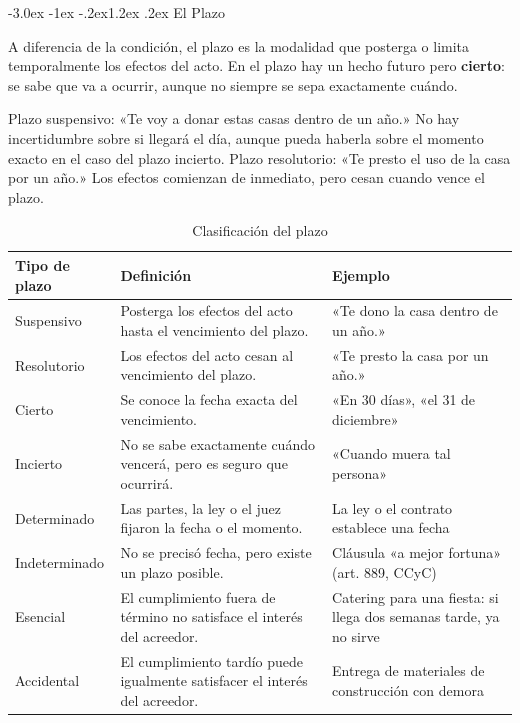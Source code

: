 \documentclass[12pt,oneside]{book}
\makeatletter
\renewcommand\section{\@startsection{section}{1}{\z@}%
  {-3.0ex \@plus -1ex \@minus -.2ex}{1.2ex \@plus .2ex}%
  {\normalfont\large\bfseries\color{acento}}}
\makeatother
\begin{document}
\section{El Plazo}

A diferencia de la condición, el plazo es la modalidad que posterga o limita temporalmente los efectos del acto. En el plazo hay un hecho futuro pero \textbf{cierto}: se sabe que va a ocurrir, aunque no siempre se sepa exactamente cuándo.

\begin{ejemplo}
Plazo suspensivo: «Te voy a donar estas casas dentro de un año.» No hay incertidumbre sobre si llegará el día, aunque pueda haberla sobre el momento exacto en el caso del plazo incierto. Plazo resolutorio: «Te presto el uso de la casa por un año.» Los efectos comienzan de inmediato, pero cesan cuando vence el plazo.
\end{ejemplo}

\begin{table}[H]
\centering
\begin{tabularx}{\textwidth}{l X X}
\toprule
\textbf{Tipo de plazo} & \textbf{Definición} & \textbf{Ejemplo} \\
\midrule
Suspensivo & Posterga los efectos del acto hasta el vencimiento del plazo. & «Te dono la casa dentro de un año.» \\
Resolutorio & Los efectos del acto cesan al vencimiento del plazo. & «Te presto la casa por un año.» \\
Cierto & Se conoce la fecha exacta del vencimiento. & «En 30 días», «el 31 de diciembre» \\
Incierto & No se sabe exactamente cuándo vencerá, pero es seguro que ocurrirá. & «Cuando muera tal persona» \\
Determinado & Las partes, la ley o el juez fijaron la fecha o el momento. & La ley o el contrato establece una fecha \\
Indeterminado & No se precisó fecha, pero existe un plazo posible. & Cláusula «a mejor fortuna» (art. 889, CCyC) \\
Esencial & El cumplimiento fuera de término no satisface el interés del acreedor. & Catering para una fiesta: si llega dos semanas tarde, ya no sirve \\
Accidental & El cumplimiento tardío puede igualmente satisfacer el interés del acreedor. & Entrega de materiales de construcción con demora \\
\bottomrule
\end{tabularx}
\caption{Clasificación del plazo}
\end{table}
\end{document}
